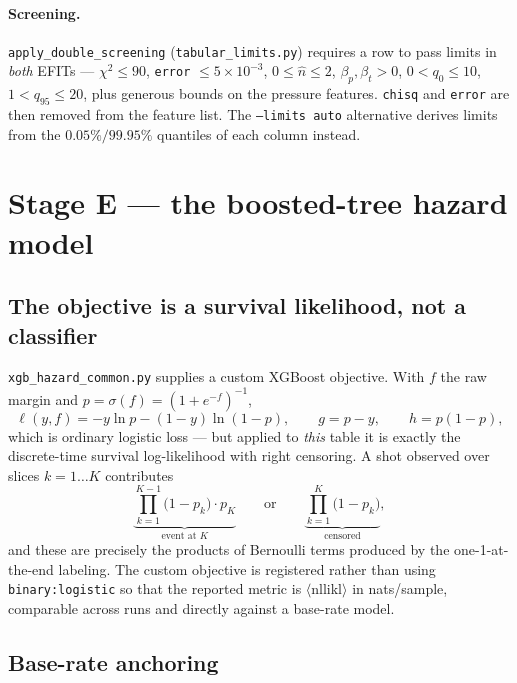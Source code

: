 \documentclass[11pt,a4paper]{article}
\newcommand{\code}[1]{\texttt{\small #1}}
\begin{document}
\paragraph{Screening.} \code{apply\_double\_screening} (\code{tabular\_limits.py}) requires a row to
pass limits in \emph{both} EFITs --- $\chi^2 \le 90$, \code{error} $\le 5\times10^{-3}$,
$0 \le \hat n \le 2$, $\beta_p,\beta_t > 0$, $0 < q_0 \le 10$, $1 < q_{95} \le 20$, plus generous
bounds on the pressure features. \code{chisq} and \code{error} are then removed from the feature
list. The \code{--limits auto} alternative derives limits from the $0.05\%/99.95\%$ quantiles of
each column instead.

\section{Stage E --- the boosted-tree hazard model}

\subsection{The objective is a survival likelihood, not a classifier}

\code{xgb\_hazard\_common.py} supplies a custom XGBoost objective. With $f$ the raw margin and
$p = \sigma(f) = (1+e^{-f})^{-1}$,
\begin{equation}
\ell(y,f) = -y\ln p - (1-y)\ln(1-p),
\qquad
g = p - y, \qquad h = p(1-p),
\end{equation}
which is ordinary logistic loss --- but applied to \emph{this} table it is exactly the discrete-time
survival log-likelihood with right censoring. A shot observed over slices $k = 1\dots K$
contributes
\begin{equation}
\underbrace{\prod_{k=1}^{K-1}\big(1-p_k\big)\cdot p_K}_{\text{event at } K}
\qquad\text{or}\qquad
\underbrace{\prod_{k=1}^{K}\big(1-p_k\big)}_{\text{censored}} ,
\end{equation}
and these are precisely the products of Bernoulli terms produced by the one-1-at-the-end labeling.
The custom objective is registered rather than using \code{binary:logistic} so that the reported
metric is $\langle$nllikl$\rangle$ in nats/sample, comparable across runs and directly against a
base-rate model.

\subsection{Base-rate anchoring}
\end{document}

